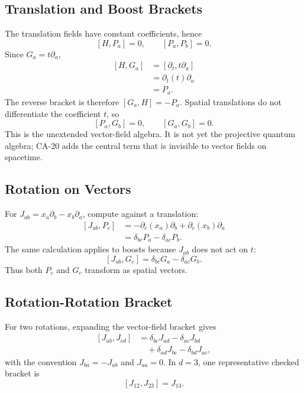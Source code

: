 \subsection{Translation and Boost Brackets}

The translation fields have constant coefficients, hence
\[
  [H,P_a]=0,\qquad [P_a,P_b]=0.
\]
Since \(G_a=t\partial_a\),
\[
\begin{aligned}
  [H,G_a]
    &= [\partial_t,t\partial_a]\\
    &= \partial_t(t)\partial_a\\
    &= P_a.
\end{aligned}
\]
The reverse bracket is therefore \([G_a,H]=-P_a\).  Spatial translations do not
differentiate the coefficient \(t\), so
\[
  [P_a,G_b]=0,\qquad [G_a,G_b]=0.
\]
This is the unextended vector-field algebra.  It is not yet the projective
quantum algebra; CA-20 adds the central term that is invisible to vector fields
on spacetime.

\subsection{Rotation on Vectors}

For \(J_{ab}=x_a\partial_b-x_b\partial_a\), compute against a translation:
\[
\begin{aligned}
  [J_{ab},P_c]
  &=
    -\partial_c(x_a)\partial_b
    +\partial_c(x_b)\partial_a\\
  &=
    \delta_{bc}P_a-\delta_{ac}P_b.
\end{aligned}
\]
The same calculation applies to boosts because \(J_{ab}\) does not act on \(t\):
\[
  [J_{ab},G_c]
  =
  \delta_{bc}G_a-\delta_{ac}G_b.
\]
Thus both \(P_c\) and \(G_c\) transform as spatial vectors.

\subsection{Rotation-Rotation Bracket}

For two rotations, expanding the vector-field bracket gives
\[
\begin{aligned}
  [J_{ab},J_{cd}]
  &=
    \delta_{bc}J_{ad}
    -\delta_{ac}J_{bd}\\
  &\quad
    +\delta_{ad}J_{bc}
    -\delta_{bd}J_{ac},
\end{aligned}
\]
with the convention \(J_{ba}=-J_{ab}\) and \(J_{aa}=0\).  In \(d=3\), one
representative checked bracket is
\[
  [J_{12},J_{23}]=J_{13}.
\]


